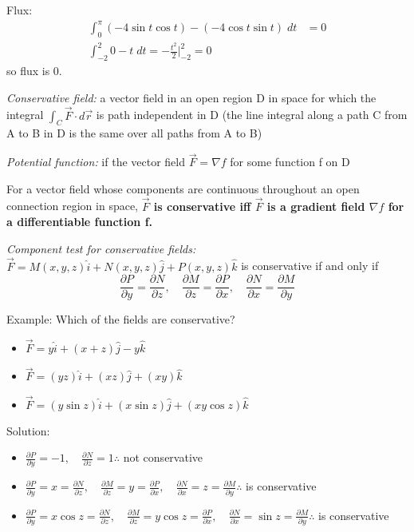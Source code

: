 \documentclass[12pt]{article}
\begin{document}
Flux: 
\begin{align*}
    \int_0^\pi (-4 \sin t\cos t) - (-4\cos t \sin t) \; dt &= 0\\
    \int_{-2}^2 0 - t \; dt = -\frac{t^2}{2} \big|_{-2}^2 = 0 
\end{align*}
so flux is 0. 

\emph{Conservative field:} a vector field in an open region D in space for which the integral $\int_C \vec{F} \cdot d\vec{r}$ is path independent in D (the line integral along a path C from A to B in D is the same over all paths from A to B)

\emph{Potential function:} if the vector field $\vec{F} = \nabla f$ for some function f on D

For a vector field whose components are continuous throughout an open connection region in space, \textbf{$\vec{F}$ is conservative iff $\vec{F}$ is a gradient field $\nabla f$ for a differentiable function f.}

\emph{Component test for conservative fields:} 
$\vec{F} = M(x,y,z)\hat{i} + N(x,y,z) \hat{j} + P(x,y,z)\hat{k}$ is conservative if and only if
\[\frac{\partial P}{\partial y} = \frac{\partial N}{\partial z}, \quad \frac{\partial M}{\partial z} = \frac{\partial P}{\partial x}, \quad \frac{\partial N}{\partial x} = \frac{\partial M}{\partial y}\] 

Example: Which of the fields are conservative?
\begin{itemize}
    \item $\vec{F} = y\hat{i} + (x+z) \hat{j} - y\hat{k}$
    \item $\vec{F} = (yz) \hat{i} + (xz) \hat{j} + (xy) \hat{k}$
    \item $\vec{F} = (y\sin z) \hat{i} + (x\sin z) \hat{j} + (xy\cos z) \hat{k}$
\end{itemize}

Solution:
\begin{itemize}
    \item $\frac{\partial P}{\partial y} = -1, \quad \frac{\partial N}{\partial z} = 1 \therefore$ not conservative
    \item $\frac{\partial P}{\partial y} = x = \frac{\partial N}{\partial z}, \quad \frac{\partial M}{\partial z} = y = \frac{\partial P}{\partial x}, \quad \frac{\partial N}{\partial x} = z = \frac{\partial M}{\partial y} \therefore$ is conservative
    \item $\frac{\partial P}{\partial y} = x\cos z = \frac{\partial N}{\partial z}, \quad \frac{\partial M}{\partial z} = y\cos z = \frac{\partial P}{\partial x}, \quad \frac{\partial N}{\partial x} = \sin z = \frac{\partial M}{\partial y} \therefore$ is conservative
\end{itemize}
\end{document}
